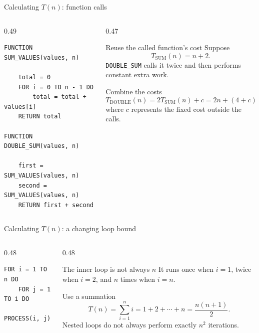 \documentclass[aspectratio=169]{beamer}
\begin{document}
\begin{frame}[fragile]{Calculating $T(n)$: function calls}
  \small
  \begin{columns}[T]
    \begin{column}{0.49\textwidth}
\begin{lstlisting}[style=pseudo,basicstyle=\ttfamily\small]
FUNCTION SUM_VALUES(values, n)
    
    total = 0
    FOR i = 0 TO n - 1 DO
        total = total + values[i]
    RETURN total

FUNCTION DOUBLE_SUM(values, n)
    
    first = SUM_VALUES(values, n)
    second = SUM_VALUES(values, n)
    RETURN first + second
\end{lstlisting}
    \end{column}
    \begin{column}{0.47\textwidth}
      \begin{block}{Reuse the called function's cost}
        Suppose
        \[
          T_{\mathrm{SUM}}(n)=n+2.
        \]
        \texttt{DOUBLE\_SUM} calls it twice and then performs constant extra
        work.
      \end{block}
      \begin{exampleblock}{Combine the costs}
        \[
          T_{\mathrm{DOUBLE}}(n)
          =2T_{\mathrm{SUM}}(n)+c
          =2n+(4+c),
        \]
        where $c$ represents the fixed cost outside the calls.
      \end{exampleblock}
    \end{column}
  \end{columns}
\end{frame}

\begin{frame}[fragile]{Calculating $T(n)$: a changing loop bound}
  \begin{columns}[T]
    \begin{column}{0.48\textwidth}
\begin{lstlisting}[style=pseudo]
FOR i = 1 TO n DO
    FOR j = 1 TO i DO
        PROCESS(i, j)
\end{lstlisting}
    \end{column}
    \begin{column}{0.48\textwidth}
      \begin{block}{The inner loop is not always $n$}
        It runs once when $i=1$, twice when $i=2$, and $n$ times when $i=n$.
      \end{block}
      \begin{alertblock}{Use a summation}
        \[
          T(n)=\sum_{i=1}^{n}i
              =1+2+\cdots+n
              =\frac{n(n+1)}{2}.
        \]
        Nested loops do not always perform exactly $n^2$ iterations.
      \end{alertblock}
    \end{column}
  \end{columns}
\end{frame}
\end{document}
